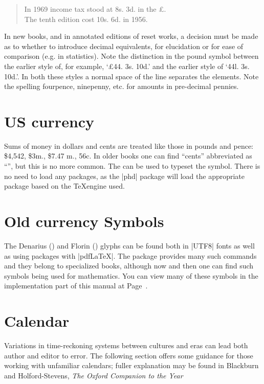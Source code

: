 \begin{quote}
In 1969 income tax stood at 8s. 3d. in the £.\\
The tenth edition cost 10s. 6d. in 1956.
\end{quote}

In new books, and in annotated editions of reset works, a decision must
be made as to whether to introduce decimal equivalents, for elucidation
or for ease of comparison (e.g. in statistics). Note the distinction in the
pound symbol between the earlier style of, for example, `£44. 3s. 10d.'
and the earlier style of `44l. 3s. 10d.'. In both these styles a normal space
of the line separates the elements. Note the spelling fourpence, ninepenny, etc. for amounts in pre-decimal pennies.  

\section{US currency}

Sums of money in dollars and cents are treated like those in pounds and
pence: \$4,542, \$3m., \$7.47 m., 56c. In older books one can find ``cents'' abbreviated as ``\textcent'', but this is no more common. The \cmd{\textcent} can be used to typeset the \textcent symbol. There is no need to load any packages, as the |phd| package will load the appropriate package based on the \TeX engine used.

\section{Old currency Symbols}
\index{\string \denarius}

The Denarius (\Denarius) and Florin (\Florin) glyphs can be found both in |UTF8| fonts as well as using packages with |pdfLaTeX|. The package  \citep{marvosym} provides many such commands and they belong to specialized books, although now and then one can find such symbols being used for mathematics. You can view many of these symbols in the implementation part of this manual at Page~\pageref{currencysymbols}.

\section{Calendar}

Variations in time-reckoning systems between cultures and eras can
lead both author and editor to error. The following section offers some
guidance for those working with unfamiliar calendars; fuller explanation
may be found in Blackburn and Holford-Stevens, \textit{The Oxford Companion
to the Year}


